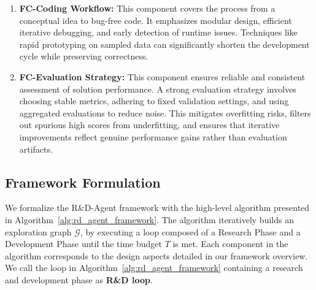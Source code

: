 \begin{enumerate}[leftmargin=4ex]
    \item[\ding{186}] \textbf{FC-Coding Workflow:} This component covers the process from a conceptual idea to bug-free code. It emphasizes modular design, efficient iterative debugging, and early detection of runtime issues. Techniques like rapid prototyping on sampled data can significantly shorten the development cycle while preserving correctness.

    \item[\ding{187}] \textbf{FC-Evaluation Strategy:} This component ensures reliable and consistent assessment of solution performance. A strong evaluation strategy involves choosing stable metrics, adhering to fixed validation settings, and using aggregated evaluations to reduce noise. This mitigates overfitting risks, filters out spurious high scores from underfitting, and ensures that iterative improvements reflect genuine performance gains rather than evaluation artifacts.
\end{enumerate}

\subsection{Framework Formulation}

We formalize the R\&D-Agent framework with the high-level algorithm presented in Algorithm~\ref{alg:rd_agent_framework}. The algorithm iteratively builds an exploration graph $\mathcal{G}$, by executing a loop composed of a Research Phase and a Development Phase until the time budget $T$ is met. Each component in the algorithm corresponds to the design aspects detailed in our framework overview. We call the loop in Algorithm~\ref{alg:rd_agent_framework} containing a research and development phase as \textbf{R\&D loop}.

